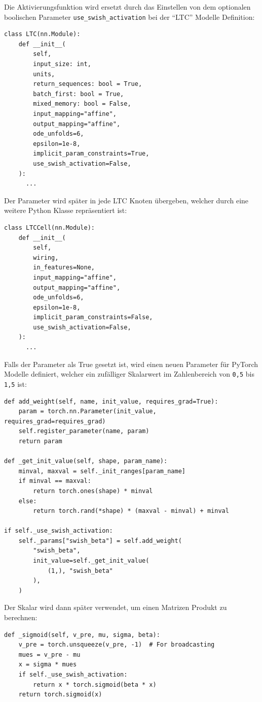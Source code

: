 \documentclass[11pt,ngerman,a4paper,]{article}
\begin{document}
Die Aktivierungsfunktion wird ersetzt durch das Einstellen von dem optionalen boolischen Parameter \texttt{use\_swish\_activation} bei der ``LTC'' Modelle Definition:

\begin{verbatim}
class LTC(nn.Module):
    def __init__(
        self,
        input_size: int,
        units,
        return_sequences: bool = True,
        batch_first: bool = True,
        mixed_memory: bool = False,
        input_mapping="affine",
        output_mapping="affine",
        ode_unfolds=6,
        epsilon=1e-8,
        implicit_param_constraints=True,
        use_swish_activation=False,
    ):
      ...
\end{verbatim}

Der Parameter wird später in jede LTC Knoten übergeben, welcher durch eine weitere Python Klasse repräsentiert ist:

\begin{verbatim}
class LTCCell(nn.Module):
    def __init__(
        self,
        wiring,
        in_features=None,
        input_mapping="affine",
        output_mapping="affine",
        ode_unfolds=6,
        epsilon=1e-8,
        implicit_param_constraints=False,
        use_swish_activation=False,
    ):
      ...
\end{verbatim}

Falls der Parameter als True gesetzt ist, wird einen neuen Parameter für PyTorch Modelle definiert, welcher ein zufälliger Skalarwert im Zahlenbereich von \texttt{0,5} bis \texttt{1,5} ist:

\begin{verbatim}
def add_weight(self, name, init_value, requires_grad=True):
    param = torch.nn.Parameter(init_value, requires_grad=requires_grad)
    self.register_parameter(name, param)
    return param

def _get_init_value(self, shape, param_name):
    minval, maxval = self._init_ranges[param_name]
    if minval == maxval:
        return torch.ones(shape) * minval
    else:
        return torch.rand(*shape) * (maxval - minval) + minval

if self._use_swish_activation:
    self._params["swish_beta"] = self.add_weight(
        "swish_beta",
        init_value=self._get_init_value(
            (1,), "swish_beta"
        ),
    )
\end{verbatim}

Der Skalar wird dann später verwendet, um einen Matrizen Produkt zu berechnen:

\begin{verbatim}
def _sigmoid(self, v_pre, mu, sigma, beta):
    v_pre = torch.unsqueeze(v_pre, -1)  # For broadcasting
    mues = v_pre - mu
    x = sigma * mues
    if self._use_swish_activation:
        return x * torch.sigmoid(beta * x)
    return torch.sigmoid(x)
\end{verbatim}
\end{document}
